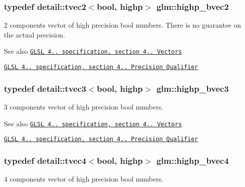 \subsubsection[{\texorpdfstring{highp\+\_\+bvec2}{highp_bvec2}}]{\setlength{\rightskip}{0pt plus 5cm}typedef detail\+::tvec2$<$bool, highp$>$ {\bf glm\+::highp\+\_\+bvec2}}\hypertarget{group__core__precision_ga4153415d1f3d390219ac9464652ac377}{}\label{group__core__precision_ga4153415d1f3d390219ac9464652ac377}
2 components vector of high precision bool numbers. There is no guarantee on the actual precision.

\begin{DoxySeeAlso}{See also}
\href{http://www.opengl.org/registry/doc/GLSLangSpec.4.20.8.pdf}{\tt G\+L\+SL 4.. specification, section 4.. Vectors} 

\href{http://www.opengl.org/registry/doc/GLSLangSpec.4.20.8.pdf}{\tt G\+L\+SL 4.. specification, section 4.. Precision Qualifier} 
\end{DoxySeeAlso}
\subsubsection[{\texorpdfstring{highp\+\_\+bvec3}{highp_bvec3}}]{\setlength{\rightskip}{0pt plus 5cm}typedef detail\+::tvec3$<$bool, highp$>$ {\bf glm\+::highp\+\_\+bvec3}}\hypertarget{group__core__precision_ga1d77a773fdd024602413670788c10c62}{}\label{group__core__precision_ga1d77a773fdd024602413670788c10c62}
3 components vector of high precision bool numbers.

\begin{DoxySeeAlso}{See also}
\href{http://www.opengl.org/registry/doc/GLSLangSpec.4.20.8.pdf}{\tt G\+L\+SL 4.. specification, section 4.. Vectors} 

\href{http://www.opengl.org/registry/doc/GLSLangSpec.4.20.8.pdf}{\tt G\+L\+SL 4.. specification, section 4.. Precision Qualifier} 
\end{DoxySeeAlso}
\subsubsection[{\texorpdfstring{highp\+\_\+bvec4}{highp_bvec4}}]{\setlength{\rightskip}{0pt plus 5cm}typedef detail\+::tvec4$<$bool, highp$>$ {\bf glm\+::highp\+\_\+bvec4}}\hypertarget{group__core__precision_ga381539af52c5e5c659700e12fb706eaf}{}\label{group__core__precision_ga381539af52c5e5c659700e12fb706eaf}
4 components vector of high precision bool numbers.

